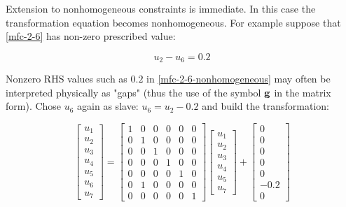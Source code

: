 Extension to nonhomogeneous constraints is immediate. In this case the transformation
equation becomes nonhomogeneous. For example suppose that \eqref{mfc-2-6}
has non-zero prescribed value:

\begin{equation}\label{mfc-2-6-nonhomogeneous}
    u_2 - u_6 = 0.2
\end{equation}

Nonzero RHS values such as $ 0.2 $ in \eqref{mfc-2-6-nonhomogeneous}
may often be interpreted physically as "gaps" (thus the use of the symbol
$ \mathbf{g} $ in the matrix form). Chose $ u_6 $ again as slave: $ u_6 = u_2 - 0.2 $
and build the transformation:

\begin{equation}
    \begin{bmatrix}
        u_1 \\
        u_2 \\
        u_3 \\
        u_4 \\
        u_5 \\
        u_6 \\
        u_7
    \end{bmatrix}
    = \begin{bmatrix}
        1 & 0 & 0 & 0 & 0 & 0 \\
        0 & 1 & 0 & 0 & 0 & 0 \\
        0 & 0 & 1 & 0 & 0 & 0 \\
        0 & 0 & 0 & 1 & 0 & 0 \\
        0 & 0 & 0 & 0 & 1 & 0 \\
        0 & 1 & 0 & 0 & 0 & 0 \\
        0 & 0 & 0 & 0 & 0 & 1
    \end{bmatrix}
    \begin{bmatrix}
        u_1 \\
        u_2 \\
        u_3 \\
        u_4 \\
        u_5 \\
        u_7
    \end{bmatrix} +
    \begin{bmatrix}
        0 \\
        0 \\
        0 \\
        0 \\
        0 \\
        -0.2 \\
        0
    \end{bmatrix}
\end{equation}

